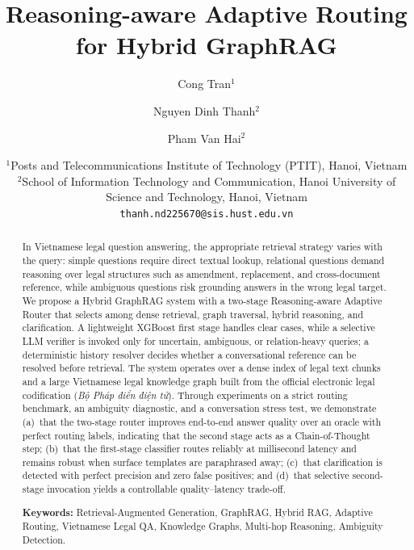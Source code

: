 ﻿\documentclass[11pt,twocolumn]{article}
\begin{document}
\title{Reasoning-aware Adaptive Routing for Hybrid GraphRAG}

\author{
  Cong Tran$^1$ \and
  Nguyen Dinh Thanh$^2$ \and
  Pham Van Hai$^2$
}
\date{
  $^1$Posts and Telecommunications Institute of Technology (PTIT), Hanoi, Vietnam\\
  $^2$School of Information Technology and Communication,
  Hanoi University of Science and Technology, Hanoi, Vietnam\\
  \texttt{thanh.nd225670@sis.hust.edu.vn}
}

\maketitle

\begin{abstract}
In Vietnamese legal question answering, the appropriate retrieval
strategy varies with the query: simple questions require direct textual
lookup, relational questions demand reasoning over legal structures such
as amendment, replacement, and cross-document reference, while ambiguous
questions risk grounding answers in the wrong legal target. We propose a
Hybrid GraphRAG system with a two-stage Reasoning-aware Adaptive Router
that selects among dense retrieval, graph traversal, hybrid reasoning, and
clarification. A lightweight XGBoost first stage handles clear cases, while
a selective LLM verifier is invoked only for uncertain, ambiguous, or
relation-heavy queries; a deterministic history resolver decides whether a
conversational reference can be resolved before retrieval. The system
operates over a dense index of legal text chunks and a large Vietnamese
legal knowledge graph built from the official electronic legal
codification (\textit{Bộ Pháp điển điện tử}). Through experiments on a
strict routing benchmark, an ambiguity diagnostic, and a conversation
stress test, we demonstrate (a)~that the two-stage router improves
end-to-end answer quality over an oracle with perfect routing labels,
indicating that the second stage acts as a Chain-of-Thought step;
(b)~that the first-stage classifier routes reliably at millisecond
latency and remains robust when surface templates are paraphrased away;
(c)~that clarification is detected with perfect precision and zero false
positives; and (d)~that selective second-stage invocation yields a
controllable quality--latency trade-off.

\smallskip
\noindent\textbf{Keywords:} Retrieval-Augmented Generation,
GraphRAG, Hybrid RAG, Adaptive Routing, Vietnamese Legal QA,
Knowledge Graphs, Multi-hop Reasoning, Ambiguity Detection.
\end{abstract}
\end{document}
